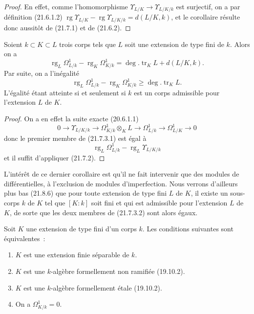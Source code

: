 \begin{proof}
En effet, comme l'homomorphisme
$\Upsilon_{L/K}\to\Upsilon_{L/K/k}$ est surjectif, on a par définition
(21.6.1.2)
$\operatorname{rg}\Upsilon_{L/K}-\operatorname{rg}\Upsilon_{L/K/k}
=d(L/K,k)$, et le corollaire résulte donc aussitôt de (21.7.1) et de
(21.6.2).
\end{proof}

\begin{corollary}[21.7.3]
\label{0.21.7.3-fr}
Soient $k\subset K\subset L$ trois corps tels que $L$ soit une extension de
type fini de $k$. Alors on a
\begin{equation}
\tag{21.7.3.1}
\label{0.21.7.3.1-fr}
\operatorname{rg}_L\Omega^1_{L/k}-\operatorname{rg}_K\Omega^1_{K/k}
=\deg.\operatorname{tr}_K L+d(L/K,k).
\end{equation}
Par suite, on a l'inégalité
\begin{equation}
\tag{21.7.3.2}
\label{0.21.7.3.2-fr}
\operatorname{rg}_L\Omega^1_{L/k}-\operatorname{rg}_K\Omega^1_{K/k}
\geqslant\deg.\operatorname{tr}_K L.
\end{equation}
L'égalité étant atteinte si et seulement si $k$ est un corps admissible pour
l'extension $L$ de $K$.
\end{corollary}

\begin{proof}
On a en effet la suite exacte (20.6.1.1)
\[
0\to\Upsilon_{L/K/k}\to\Omega^1_{K/k}\otimes_KL\to\Omega^1_{L/k}
\to\Omega^1_{L/K}\to0
\]
donc le premier membre de (21.7.3.1) est égal à
\[
\operatorname{rg}_L\Omega^1_{L/k}-\operatorname{rg}_L\Upsilon_{L/K/k}
\]
et il suffit d'appliquer (21.7.2).
\end{proof}

L'intérêt de ce dernier corollaire est qu'il ne fait intervenir que des
modules de différentielles, à l'exclusion de modules d'imperfection. Nous
verrons d'ailleurs plus bas (21.8.6) que pour toute extension de type fini
$L$ de $K$, il existe un sous-corps $k$ de $K$ tel que $[K:k]$ soit fini et
qui est admissible pour l'extension $L$ de $K$, de sorte que les deux membres
de (21.7.3.2) sont alors égaux.

\begin{corollary}[21.7.4]
\label{0.21.7.4-fr}
Soit $K$ une extension de type fini d'un corps $k$. Les conditions suivantes
sont équivalentes~:
\begin{enumerate}
  \item[\rm a)] $K$ est une extension finie séparable de $k$.
  \item[\rm b)] $K$ est une $k$-algèbre formellement non ramifiée (19.10.2).
  \item[\rm c)] $K$ est une $k$-algèbre formellement étale (19.10.2).
  \item[\rm d)] On a $\Omega^1_{K/k}=0$.
\end{enumerate}
\end{corollary}

